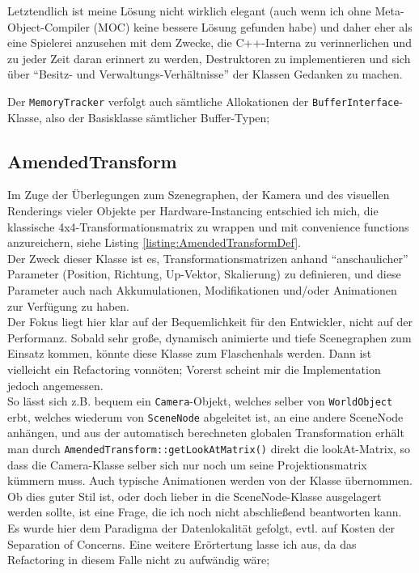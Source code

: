 	Letztendlich ist meine Lösung nicht wirklich elegant (auch wenn ich ohne Meta-Object-Compiler (MOC) keine bessere 	
	Lösung gefunden habe) und daher eher als eine Spielerei anzusehen
	mit dem Zwecke, die C++-Interna zu verinnerlichen und zu jeder Zeit daran erinnert zu werden, 
	Destruktoren zu implementieren und sich über 
	"`Besitz- und Verwaltungs-Verhältnisse"' der Klassen Gedanken zu machen.
	
	Der \lstinline|MemoryTracker| verfolgt auch sämtliche Allokationen der \lstinline|BufferInterface|-Klasse,
	also der Basisklasse sämtlicher Buffer-Typen;
	
\subsection{AmendedTransform}
	\label{sec:AmendedTransform}
 	Im Zuge der Überlegungen zum Szenegraphen, der Kamera und des visuellen Renderings vieler Objekte per
 	Hardware-Instancing entschied ich mich, die klassische 4x4-Transformationsmatrix zu wrappen und mit
 	convenience functions anzureichern, siehe Listing \ref{listing:AmendedTransformDef}.\\
 	Der Zweck dieser Klasse ist es, Transformationsmatrizen anhand "`anschaulicher"' Parameter 
 	(Position, Richtung, Up-Vektor, Skalierung) zu definieren,
 	und diese Parameter auch nach Akkumulationen, Modifikationen und/oder Animationen zur Verfügung zu haben.\\
 	Der Fokus liegt hier klar auf der Bequemlichkeit für den Entwickler, nicht auf der Performanz.
 	Sobald sehr große, dynamisch animierte und tiefe Scenegraphen zum Einsatz kommen, könnte diese Klasse
 	zum Flaschenhals werden. Dann ist vielleicht ein Refactoring vonnöten; Vorerst scheint mir die Implementation jedoch
 	angemessen.\\
 	
 	So lässt sich z.B. bequem ein \lstinline|Camera|-Objekt, welches selber von \lstinline|WorldObject| erbt,
 	welches wiederum von \lstinline|SceneNode| abgeleitet ist, an eine andere SceneNode anhängen, und aus der automatisch
 	berechneten globalen Transformation erhält man durch \lstinline|AmendedTransform::getLookAtMatrix()|
 	direkt die lookAt-Matrix, so  dass die Camera-Klasse selber sich nur noch um seine Projektionsmatrix kümmern muss.
 	Auch typische Animationen werden von der Klasse übernommen. Ob dies guter Stil ist, oder doch lieber in die
 	SceneNode-Klasse ausgelagert werden sollte, ist eine Frage, die ich noch nicht abschließend beantworten kann.
 	Es wurde hier dem Paradigma der Datenlokalität gefolgt, evtl. auf Kosten der Separation of Concerns.
 	Eine weitere Erörtertung lasse ich aus, da das Refactoring in diesem Falle nicht zu aufwändig wäre;

